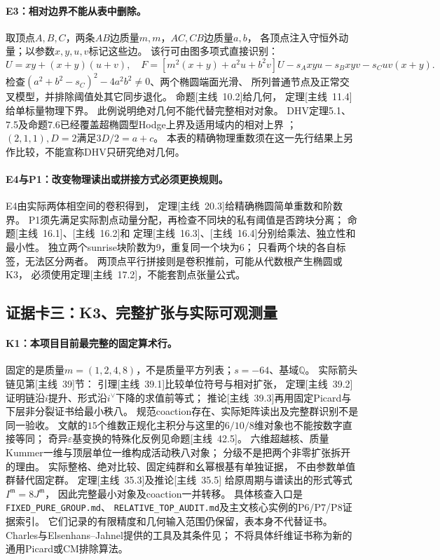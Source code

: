 \documentclass[11pt,a4paper]{ctexart}
\theoremstyle{cnplain}\newtheorem{theorem}{定理}[section]
\theoremstyle{definition}\newtheorem{definition}[theorem]{定义}
\theoremstyle{remark}\newtheorem{remark}[theorem]{注}
\newcommand{\Q}{\mathbb Q}\newcommand{\cC}{\mathcal C}
\begin{document}
\paragraph{E3：相对边界不能从表中删除。}
取顶点$A,B,C$，两条$AB$边质量$m,m$，$AC,CB$边质量$a,b$，
各顶点注入守恒外动量；以参数$x,y,u,v$标记这些边。
该行可由图多项式直接识别：
\[
 U=xy+(x+y)(u+v),\quad
 F=[m^2(x+y)+a^2u+b^2v]U-s_Axyu-s_Bxyv-s_Cuv(x+y).
\]
检查$(a^2+b^2-s_C)^2-4a^2b^2\ne0$、两个椭圆端面光滑、
所列普通节点及正常交叉模型，并排除阈值处其它同步退化。
命题\textup{[主线~10.2]}给几何，
定理\textup{[主线~11.4]}给单标量物理下界。
此例说明绝对几何不能代替完整相对对象。
DHV定理5.1、7.5及命题7.6已经覆盖超椭圆型Hodge上界及适用域内的相对上界
\cite{DHV}；$(2,1,1),D=2$满足$3D/2=a+c$。
本表的精确物理重数须在这一先行结果上另作比较，不能宣称DHV只研究绝对几何。

\paragraph{E4与P1：改变物理读出或拼接方式必须更换规则。}
E4由实际两体相空间的卷积得到，
定理\textup{[主线~20.3]}给精确椭圆简单重数和阶数界。
P1须先满足实际割点动量分配，再检查不同块的私有阈值是否跨块分离；
命题\textup{[主线~16.1]}、\textup{[主线~16.2]}和
定理\textup{[主线~16.3]}、\textup{[主线~16.4]}分别给乘法、独立性和最小性。
独立两个sunrise块阶数为9，重复同一个块为6；
只看两个块的各自标签，无法区分两者。
两顶点平行拼接则是卷积推前，可能从代数根产生椭圆或K3，
必须使用定理\textup{[主线~17.2]}，不能套割点张量公式。

\subsection{证据卡三：K3、完整扩张与实际可观测量}
\label{subsec:classkthree}
\paragraph{K1：本项目目前最完整的固定算术行。}
固定的是质量$m=(1,2,4,8)$，不是质量平方列表；$s=-64$、基域$\Q$。
实际箭头链见第\textup{[主线~39]}节：
引理\textup{[主线~39.1]}比较单位符号与相对扩张，
定理\textup{[主线~39.2]}证明链沿$i$提升、形式沿$i^\vee$下降的求值前等式；
推论\textup{[主线~39.3]}再用固定Picard与下层非分裂证书给最小秩八。
规范coaction存在、实际矩阵读出及完整群识别不是同一验收。
文献的$15$个维数正规化主积分与这里的$6/10/8$维对象也不能按数字直接等同；
奇异$\varepsilon$基变换的特殊化反例见命题\textup{[主线~42.5]}。
六维超越核、质量Kummer一维与顶层单位一维构成活动秩八对象；
分级不是把两个非零扩张拆开的理由。
实际整格、绝对比较、固定纯群和幺幂根基有单独证据，
不由参数单值群替代固定群。
定理\textup{[主线~35.3]}及推论\textup{[主线~35.5]}
给原周期与谱读出的形式等式$I^{\mathfrak m}=8J^{\mathfrak m}$，
因此完整最小对象及coaction一并转移。
具体核查入口是\texttt{FIXED\_PURE\_GROUP.md}、
\texttt{RELATIVE\_TOP\_AUDIT.md}及主文核心实例的P6/P7/P8证据索引。
它们记录的有限精度和几何输入范围仍保留，表本身不代替证书。
Charles与Elsenhans--Jahnel提供的工具及其条件见\cite{LitCharles,LitEJ}；
不将具体纤维证书称为新的通用Picard或CM排除算法。
\end{document}
